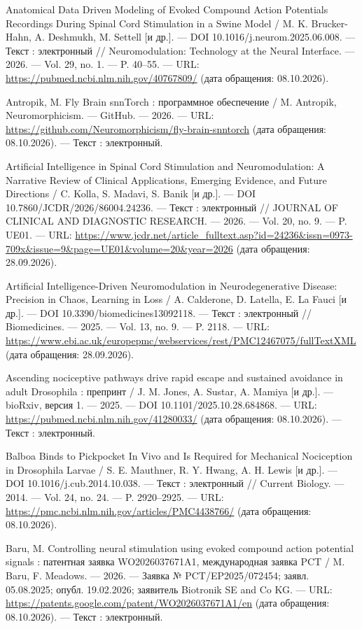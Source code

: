\begin{list}{}{\setlength{\leftmargin}{10mm}\setlength{\labelwidth}{8mm}\setlength{\labelsep}{2mm}\setlength{\itemsep}{0pt}\setlength{\parsep}{0pt}\setlength{\topsep}{0pt}}
\item[35.] Anatomical Data Driven Modeling of Evoked Compound Action Potentials Recordings During Spinal Cord Stimulation in a Swine Model / M. K. Brucker-Hahn, A. Deshmukh, M. Settell [и др.]. — DOI 10.1016/j.neurom.2025.06.008. — Текст : электронный // Neuromodulation: Technology at the Neural Interface. — 2026. — Vol. 29, no. 1. — P. 40–55. — URL: \url{https://pubmed.ncbi.nlm.nih.gov/40767809/} (дата обращения: 08.10.2026).
\item[36.] Antropik, M. Fly Brain snnTorch : программное обеспечение / M. Antropik, Neuromorphicism. — GitHub. — 2026. — URL: \url{https://github.com/Neuromorphicism/fly-brain-snntorch} (дата обращения: 08.10.2026). — Текст : электронный.
\item[37.] Artificial Intelligence in Spinal Cord Stimulation and Neuromodulation: A Narrative Review of Clinical Applications, Emerging Evidence, and Future Directions / C. Kolla, S. Madavi, S. Banik [и др.]. — DOI 10.7860/JCDR/2026/86004.24236. — Текст : электронный // JOURNAL OF CLINICAL AND DIAGNOSTIC RESEARCH. — 2026. — Vol. 20, no. 9. — P. UE01. — URL: \url{https://www.jcdr.net/article\_fulltext.asp?id=24236\&issn=0973-709x\&issue=9\&page=UE01\&volume=20\&year=2026} (дата обращения: 28.09.2026).
\item[38.] Artificial Intelligence-Driven Neuromodulation in Neurodegenerative Disease: Precision in Chaos, Learning in Loss / A. Calderone, D. Latella, E. La Fauci [и др.]. — DOI 10.3390/biomedicines13092118. — Текст : электронный // Biomedicines. — 2025. — Vol. 13, no. 9. — P. 2118. — URL: \url{https://www.ebi.ac.uk/europepmc/webservices/rest/PMC12467075/fullTextXML} (дата обращения: 28.09.2026).
\item[39.] Ascending nociceptive pathways drive rapid escape and sustained avoidance in adult Drosophila : препринт / J. M. Jones, A. Sustar, A. Mamiya [и др.]. — bioRxiv, версия 1. — 2025. — DOI 10.1101/2025.10.28.684868. — URL: \url{https://pubmed.ncbi.nlm.nih.gov/41280033/} (дата обращения: 08.10.2026). — Текст : электронный.
\item[40.] Balboa Binds to Pickpocket In Vivo and Is Required for Mechanical Nociception in Drosophila Larvae / S. E. Mauthner, R. Y. Hwang, A. H. Lewis [и др.]. — DOI 10.1016/j.cub.2014.10.038. — Текст : электронный // Current Biology. — 2014. — Vol. 24, no. 24. — P. 2920–2925. — URL: \url{https://pmc.ncbi.nlm.nih.gov/articles/PMC4438766/} (дата обращения: 08.10.2026).
\item[41.] Baru, M. Controlling neural stimulation using evoked compound action potential signals : патентная заявка WO2026037671A1, международная заявка PCT / M. Baru, F. Meadows. — 2026. — Заявка № PCT/EP2025/072454; заявл. 05.08.2025; опубл. 19.02.2026; заявитель Biotronik SE and Co KG. — URL: \url{https://patents.google.com/patent/WO2026037671A1/en} (дата обращения: 08.10.2026). — Текст : электронный.

\end{list}
